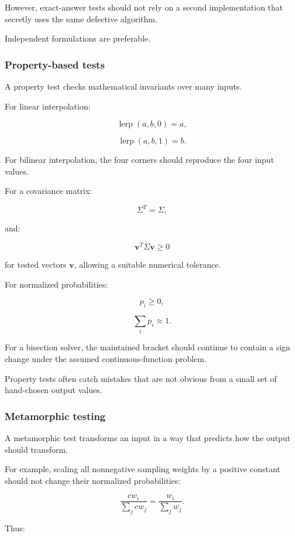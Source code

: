 However, exact-answer tests should not rely on a second implementation that secretly uses the same defective algorithm.

Independent formulations are preferable.

\subsubsection{Property-based tests}\label{02-foundations-ii-ch031-property-based-tests}

A property test checks mathematical invariants over many inputs.

For linear interpolation:

\[ \operatorname{lerp}(a,b,0)=a, \]

\[ \operatorname{lerp}(a,b,1)=b. \]

For bilinear interpolation, the four corners should reproduce the four input values.

For a covariance matrix:

\[ \Sigma^T=\Sigma, \]

and:

\[ \mathbf v^T\Sigma\mathbf v\ge0 \]

for tested vectors \(\mathbf v\), allowing a suitable numerical tolerance.

For normalized probabilities:

\[ p_i\ge0, \]

\[ \sum_ip_i\approx1. \]

For a bisection solver, the maintained bracket should continue to contain a sign change under the assumed continuous-function problem.

Property tests often catch mistakes that are not obvious from a small set of hand-chosen output values.

\subsubsection{Metamorphic testing}\label{02-foundations-ii-ch031-metamorphic-testing}

A metamorphic test transforms an input in a way that predicts how the output should transform.

For example, scaling all nonnegative sampling weights by a positive constant should not change their normalized probabilities:

\[ \frac{cw_i}{\sum_jcw_j} = \frac{w_i}{\sum_jw_j}. \]

Thus:

